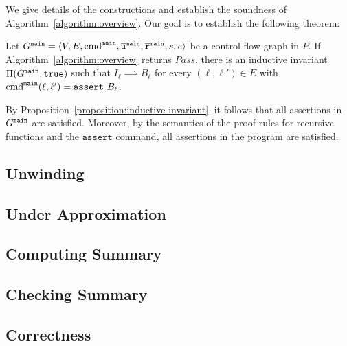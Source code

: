 
We give details of the constructions and establish the soundness of
Algorithm~\ref{algorithm:overview}. Our goal is to establish the
following theorem:

\begin{theorem}
  Let $G^{\mathtt{{main}}} = \langle V, E, \textmd{cmd}^{\mathtt{{main}}} , \overline{\mathtt{u}}^{\mathtt{{main}}}, \overline{\mathtt{r}}^{\mathtt{{main}}},s,e \rangle$ be a control flow
  graph in $P$. If Algorithm~\ref{algorithm:overview} returns
  $\mathit{Pass}$, there is an inductive invariant $\Pi (G^{\mathtt{{main}}}, \mathtt{true})$
  such that $I_{\ell} \implies B_{\ell}$ for every $(\ell, \ell') \in
  E$ with $\textmd{cmd}^{\mathtt{{main}}} (\ell, \ell') = \mathtt{assert\ } B_{\ell}$.
  \label{theorem:soundness}
\end{theorem}
By Proposition~\ref{proposition:inductive-invariant}, it follows that
all assertions in $G^{\mathtt{{main}}}$ are satisfied.
Moreover, by the semantics of the proof rules for recursive functions and the 
$\mathtt{assert}$ command, all assertions in the program are satisfied.



 
\subsection{Unwinding}
\label{subsection:unwinding}


\subsection{Under Approximation}
\label{subsection:under-approximation}


\subsection{Computing Summary}
\label{subsection:updating-summary}


\subsection{Checking Summary}
\label{subsection:checking-summary}


\subsection{Correctness}
\label{subsection:correctness}
